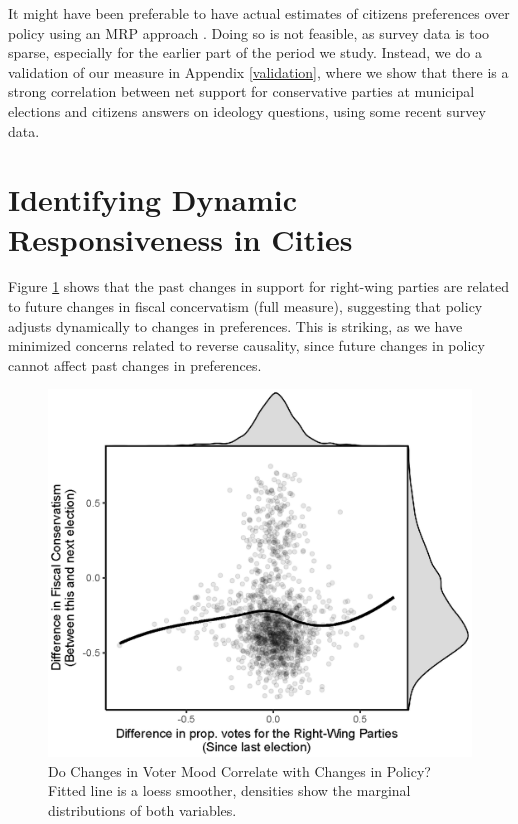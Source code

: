 \documentclass[a4paper,12pt]{article}
\begin{document}
 It might have been preferable to have actual estimates of citizens preferences over policy using an MRP approach \citep[similar to the measure used by][]{tausanovitch2014representation}. Doing so is not feasible, as survey data is too sparse, especially for the earlier part of the period we study. Instead, we do a validation of our measure in Appendix \ref{validation}, where we show that there is a strong correlation between net support for conservative parties at municipal elections and citizens answers on ideology questions, using some recent survey data.


\section*{Identifying Dynamic Responsiveness in Cities}
Figure \ref{fig:scatter} shows that the past changes in support for right-wing parties are related to future changes in fiscal concervatism (full measure), suggesting that  policy adjusts dynamically to changes in preferences. This is striking, as we have minimized concerns related to reverse causality, since  future changes in policy cannot affect past changes in preferences.

\begin{figure}[h]
	\centering
	\includegraphics[scale = 1.2]{fd_plot.eps}
	\caption{Do Changes in Voter Mood Correlate with Changes in Policy? Fitted line is a loess smoother, densities show the marginal distributions of both variables.}
	\label{fig:scatter}
\end{figure}
\end{document}
